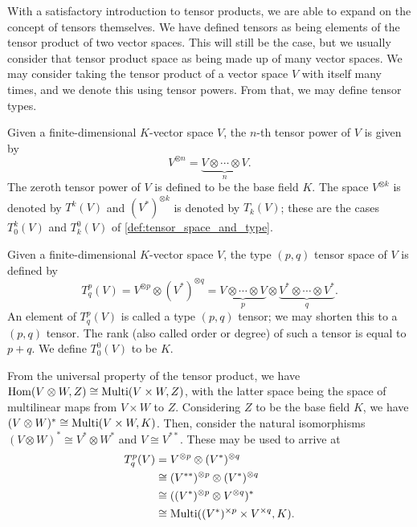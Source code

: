 \documentclass[a4paper,12pt]{article}
\begin{document}
With a satisfactory introduction to tensor products, we are able to expand on the concept of tensors themselves.
We have defined tensors as being elements of the tensor product of two vector spaces.
This will still be the case, but we usually consider that tensor product space as being made up of many vector spaces.
We may consider taking the tensor product of a vector space $V$ with itself many times, and we denote this using tensor powers.
From that, we may define tensor types.
\begin{definition}\label{def:tensor_power}
    Given a finite-dimensional $K$-vector space $V$, the $n$-th tensor power of $V$ is given by
    \begin{equation}
    V^{\otimes n} = \underbrace{V \otimes \cdots \otimes V}_{n}.
    \end{equation}
    The zeroth tensor power of $V$ is defined to be the base field $K$.
    The space $V^{\otimes k}$ is denoted by $T^k(V)$ and $(V^*)^{\otimes k}$ is denoted by $T_k(V)$; these are the cases $T^k_0(V)$ and $T^0_k(V)$ of \cref{def:tensor_space_and_type}.
\end{definition}
\begin{definition}\label{def:tensor_space_and_type}
    Given a finite-dimensional $K$-vector space $V$, the type $(p, q)$ tensor space of $V$ is defined by
    \begin{equation}
        T^p_q(V) = V^{\otimes p} \otimes (V^*)^{\otimes q} = \underbrace{V \otimes \cdots \otimes V}_{p} \otimes \underbrace{V^* \otimes \cdots \otimes V^*}_{q}.
    \end{equation}
    An element of $T^p_q(V)$ is called a type $(p, q)$ tensor; we may shorten this to a $(p, q)$ tensor.
    The rank (also called order or degree) of such a tensor is equal to $p + q$.
    We define $T^0_0(V)$ to be $K$.
\end{definition}
From the universal property of the tensor product, we have $\operatorname{\mathrm{Hom}}(V \otimes W, Z) \cong \operatorname{Multi}(V \times W, Z)$, with the latter space being the space of multilinear maps from $V \times W$ to $Z$.
Considering $Z$ to be the base field $K$, we have $(V \otimes W)^* \cong \operatorname{Multi}(V \times W, K)$.
Then, consider the natural isomorphisms $(V \otimes W)^* \cong V^* \otimes W^*$ and $V \cong V^{**}$.
These may be used to arrive at
\begin{align}
    \begin{split}
        T^p_q(V) &= V^{\otimes p} \otimes (V^*)^{\otimes q} \\
    &\cong (V^{**})^{\otimes p} \otimes (V^*)^{\otimes q} \\
    &\cong ((V^*)^{\otimes p} \otimes V^{\otimes q})^{*} \\ 
    &\cong \operatorname{Multi}((V^*)^{\times p} \times V^{\times q}, K).
    \end{split}
\end{align}
\end{document}
